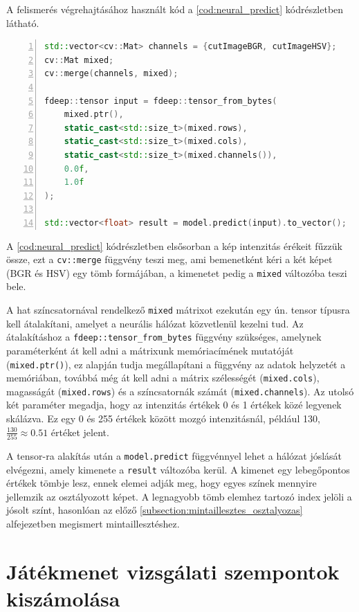 \par A felismerés végrehajtásához használt kód a \ref{cod:neural_predict} kódrészletben látható.

\vspace{2mm}
\hspace{-10mm}
\begin{minipage}{\linewidth}
\begin{lstlisting}[language=C++, numbers=left, caption={A neurális hálóval történő osztályozás menete.}, label={cod:neural_predict}]
std::vector<cv::Mat> channels = {cutImageBGR, cutImageHSV};
cv::Mat mixed;
cv::merge(channels, mixed);

fdeep::tensor input = fdeep::tensor_from_bytes(
    mixed.ptr(),
    static_cast<std::size_t>(mixed.rows),
    static_cast<std::size_t>(mixed.cols),
    static_cast<std::size_t>(mixed.channels()),
    0.0f,
    1.0f
);

std::vector<float> result = model.predict(input).to_vector();
\end{lstlisting}
\end{minipage}

\par A \ref{cod:neural_predict} kódrészletben elsősorban a kép intenzitás érékeit fűzzük össze, ezt a \lstinline{cv::merge} függvény\cite{opencv_docs} teszi meg, ami bemenetként kéri a két képet (BGR és HSV) egy tömb formájában, a kimenetet pedig a \lstinline{mixed} változóba teszi bele.
\par A hat színcsatornával rendelkező \lstinline{mixed} mátrixot ezekután egy ún. tensor típusra kell átalakítani, amelyet a neurális hálózat közvetlenül kezelni tud. Az átalakításhoz a \lstinline{fdeep::tensor_from_bytes} függvény\cite{frugally_deep2016} szükséges, amelynek paraméterként át kell adni a mátrixunk memóriacímének mutatóját (\lstinline{mixed.ptr()}), ez alapján tudja megállapítani a függvény az adatok helyzetét a memóriában, továbbá még át kell adni a mátrix szélességét (\lstinline{mixed.cols}), magasságát (\lstinline{mixed.rows}) és a színcsatornák számát (\lstinline{mixed.channels}). Az utolsó két paraméter megadja, hogy az intenzitás értékek 0 és 1 értékek közé legyenek skálázva. Ez egy 0 és 255 értékek között mozgó intenzitásnál, például 130, $\frac{130}{255} \approx 0.51$ értéket jelent.
\par A tensor-ra alakítás után a \lstinline{model.predict} függvénnyel\cite{frugally_deep2016} lehet a hálózat jóslását elvégezni, amely kimenete a \lstinline{result} változóba kerül. A kimenet egy lebegőpontos értékek tömbje lesz, ennek elemei adják meg, hogy egyes színek mennyire jellemzik az osztályozott képet. A legnagyobb tömb elemhez tartozó index jelöli a jósolt színt, hasonlóan az előző \ref{subsection:mintaillesztes_osztalyozas} alfejezetben megismert mintaillesztéshez.

\section{Játékmenet vizsgálati szempontok kiszámolása}